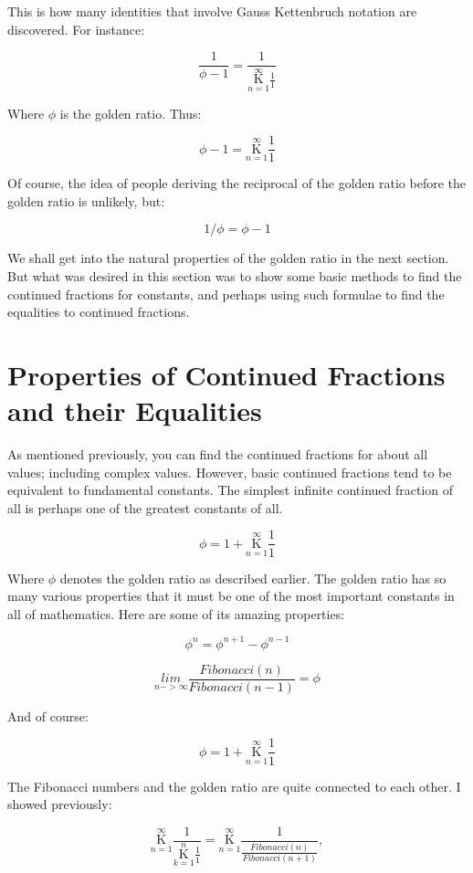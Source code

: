 \documentclass{article}
\begin{document}
This is how many identities that involve Gauss Kettenbruch notation are discovered. For instance:

$$\frac{1}{\phi-1} =  \frac{1}{\underset{n=1}{\overset{\infty}{ \mathrm K}} \frac{1}{1}} $$

Where $\phi$ is the golden ratio. Thus:

$$\phi-1 =  \underset{n=1}{\overset{\infty}{ \mathrm K}} \frac{1}{1}  $$

Of course, the idea of people deriving the reciprocal of the golden ratio before the golden ratio is unlikely, but:

 $$1/\phi = \phi - 1 $$

We shall get into the natural properties of the golden ratio in the next section. But what was desired in this section was to show some basic methods to find the continued fractions for constants, and perhaps using such formulae to find the equalities to continued fractions.

\section{Properties of Continued Fractions and their Equalities}

As mentioned previously, you can find the continued fractions for about all values; including complex values. However, basic continued fractions tend to be equivalent to fundamental constants. The simplest infinite continued fraction of all is perhaps one of the greatest constants of all.

$$\phi = 1+ \underset{n=1}{\overset{\infty}{ \mathrm K}} \frac{1}{1} $$

Where $\phi$ denotes the golden ratio as described earlier. The golden ratio has so many various properties that it must be one of the most important constants in all of mathematics. Here are some of its amazing properties:

$$\phi^{n} = \phi^{n+1} - \phi^{n-1} $$

$$\underset{n->\infty}{lim} \frac{Fibonacci(n)}{Fibonacci(n-1)}= \phi$$

And of course:

$$\phi = 1+ \underset{n=1}{\overset{\infty}{ \mathrm K}} \frac{1}{1} $$

The Fibonacci numbers and the golden ratio are quite connected to each other. I showed previously:

$$ \underset{n=1}{\overset{\infty}{ \mathrm K}} \frac{1}{ \underset{k=1}{\overset{n}{ \mathrm K}} \frac{1}{1} } = \underset{n=1}{\overset{\infty}{ \mathrm K}} \frac{1}{\frac{Fibonacci(n)}{Fibonacci(n+1)}},$$
\end{document}
